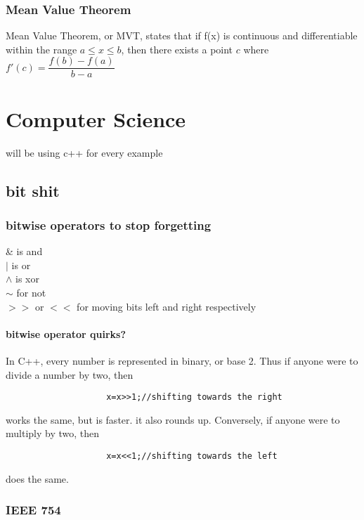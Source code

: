 \documentclass{article} %
\begin{document}
        \subsubsection{Mean Value Theorem} %
        \label{ssub:Mean Value Theorem}
            Mean Value Theorem, or MVT, states that if f(x) is continuous and differentiable within the range $a\le x \le b$, then there exists a point $c$ where $f'(c) = \dfrac{f(b)-f(a)}{b-a}$
\section{Computer Science}\label{Computer Science}
will be using c++ for every example
    \subsection{bit shit}
        \subsubsection{bitwise operators to stop forgetting}
            \begin{center}
                \& is and\\$|$ is or\\$\wedge$ is xor\\$\sim$ for not\\$>>$ or $<<$ for moving bits left and right respectively
            \end{center}
            \paragraph{bitwise operator quirks?}
                In C++, every number is represented in binary, or base 2. Thus if anyone were to divide a number by two, then
                \begin{verbatim}
                    x=x>>1;//shifting towards the right
                \end{verbatim}
                works the same, but is faster. it also rounds up. Conversely, if anyone were to multiply by two, then 
                \begin{verbatim}
                    x=x<<1;//shifting towards the left
                \end{verbatim}
                does the same.
        \subsubsection{IEEE 754}
\end{document}
